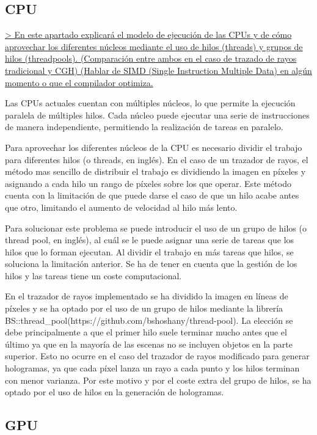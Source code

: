 \documentclass[10pt, a4paper]{article}
\begin{document}
\subsection{CPU}

\underline{> En este apartado explicará el modelo de ejecución de las CPUs y de cómo aprovechar los diferentes núcleos mediante el uso de hilos (threads) y grupos de hilos (threadpools). (Comparación entre ambos en el caso de trazado de rayos tradicional y CGH) (Hablar de SIMD (Single Instruction Multiple Data) en algún momento o que el compilador optimiza.}

Las CPUs actuales cuentan con múltiples núcleos, lo que permite la ejecución paralela de múltiples hilos. Cada núcleo puede ejecutar una serie de instrucciones de manera independiente, permitiendo la realización de tareas en paralelo.

Para aprovechar los diferentes núcleos de la CPU es necesario dividir el trabajo para diferentes hilos (o threads, en inglés). En el caso de un trazador de rayos, el método mas sencillo de distribuir el trabajo es dividiendo la imagen en píxeles y asignando a cada hilo un rango de píxeles sobre los que operar. Este método cuenta con la limitación de que puede darse el caso de que un hilo acabe antes que otro, limitando el aumento de velocidad al hilo más lento. 

Para solucionar este problema se puede introducir el uso de un grupo de hilos (o thread pool, en inglés), al cuál se le puede asignar una serie de tareas que los hilos que lo forman ejecutan. Al dividir el trabajo en más tareas que hilos, se soluciona la limitación anterior. Se ha de tener en cuenta que la gestión de los hilos y las tareas tiene un coste computacional.

En el trazador de rayos implementado se ha dividido la imagen en líneas de píxeles y se ha optado por el uso de un grupo de hilos mediante la librería BS::thread_pool(https://github.com/bshoshany/thread-pool). La elección se debe principalmente a que el primer hilo suele terminar mucho antes que el último ya que en la mayoría de las escenas no se incluyen objetos en la parte superior. Esto no ocurre en el caso del trazador de rayos modificado para generar hologramas, ya que cada píxel lanza un rayo a cada punto y los hilos terminan con menor varianza. Por este motivo y por el coste extra del grupo de hilos, se ha optado por el uso de hilos en la generación de hologramas.

\subsection{GPU}
\end{document}
